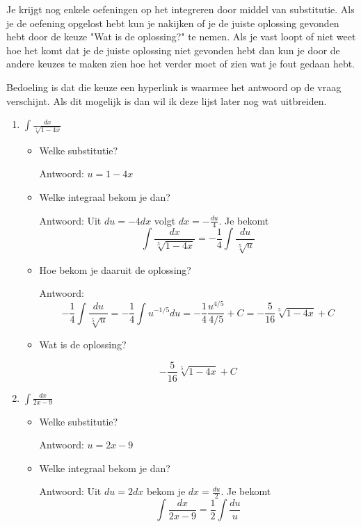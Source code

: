 \documentclass{article}
\begin{document}
Je krijgt nog enkele oefeningen op het integreren door middel van substitutie.
Als je de oefening opgelost hebt kun je nakijken of je de juiste oplossing gevonden hebt door de keuze "Wat is de oplossing?" te nemen.
Als je vast loopt of niet weet hoe het komt dat je de juiste oplossing niet gevonden hebt dan kun je door de andere keuzes te maken zien hoe het verder moet of zien wat je fout gedaan hebt.

\vspace {3mm}

Bedoeling is dat die keuze een hyperlink is waarmee het antwoord op de vraag verschijnt.
Als dit mogelijk is dan wil ik deze lijst later nog wat uitbreiden.

\vspace{2mm}

\begin{enumerate}

\item $\int \frac{dx}{\sqrt[5]{1-4x}}$

\begin{itemize}
\item Welke substitutie?

Antwoord: $u=1-4x$
\item Welke integraal bekom je dan?

Antwoord: Uit $du=-4dx$ volgt $dx=-\frac{du}{4}$.
Je bekomt
\[
\int \frac{dx}{\sqrt[5]{1-4x}}=-\frac{1}{4}\int \frac{du}{\sqrt[5]{u} }
\]

\item Hoe bekom je daaruit de oplossing?

Antwoord: 
\[
-\frac{1}{4}\int \frac{du}{\sqrt[5]{u}}=-\frac{1}{4}\int u^{-1/5}du = -\frac{1}{4}\frac{u^{4/5}}{4/5}+C=-\frac{5}{16}\sqrt[5]{1-4x}+C 
\]

\item Wat is de oplossing?

\[
-\frac{5}{16}\sqrt[5]{1-4x}+C 
\]
\end{itemize}


\item $\int \frac{dx}{2x-9}$

\begin{itemize}
\item Welke substitutie?

Antwoord: $u=2x-9$

\item Welke integraal bekom je dan?

Antwoord: Uit $du=2dx$ bekom je $dx=\frac{du}{2}$.
Je bekomt
\[
\int \frac{dx}{2x-9}=\frac{1}{2} \int \frac{du}{u}
\]


\end{itemize}
\end{enumerate}
\end{document}
